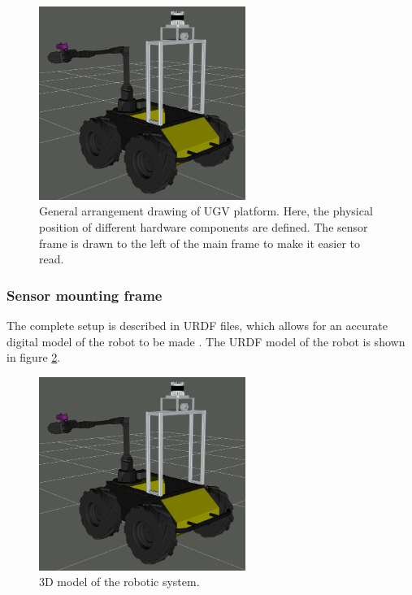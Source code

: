 \begin{figure}[H]
  \centering
   \includegraphics[width = 0.6\textwidth]{Figures/husky_initiated.png}
  \caption{General arrangement drawing of UGV platform. Here, the physical position of different hardware components are defined. The sensor frame is drawn to the left of the main frame to make it easier to read.}
  \label{fig:general_arrangement}
\end{figure}

\subsubsection{Sensor mounting frame}


The complete setup is described in URDF files, which allows for an accurate digital model of the robot to be made . The URDF model of the robot is shown in figure \ref{fig:hardware}.

\begin{figure}[H]
  \centering
  \includegraphics[width = 0.6\textwidth]{Figures/husky_initiated.png}
  \caption{3D model of the robotic system.}
  \label{fig:hardware}
\end{figure}

